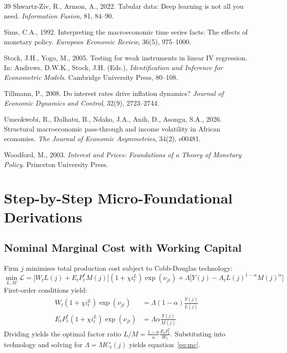 \documentclass[review,12pt]{elsarticle}
\begin{document}
\begin{thebibliography}{39}
Shwartz-Ziv, R., Armon, A., 2022. Tabular data: Deep learning is not all you need.
\textit{Information Fusion}, 81, 84--90.

Sims, C.A., 1992. Interpreting the macroeconomic time series facts: The effects
of monetary policy. \textit{European Economic Review}, 36(5), 975--1000.

Stock, J.H., Yogo, M., 2005. Testing for weak instruments in linear IV
regression. In: Andrews, D.W.K., Stock, J.H. (Eds.),
\textit{Identification and Inference for Econometric Models}.
Cambridge University Press, 80--108.

Tillmann, P., 2008. Do interest rates drive inflation dynamics?
\textit{Journal of Economic Dynamics and Control}, 32(9), 2723--2744.

Umeokwobi, R., Dalhatu, B., Ndako, J.A., Anih, D., Asongu, S.A., 2026.
Structural macroeconomic pass-through and income volatility in African economies.
\textit{The Journal of Economic Asymmetries}, 34(2), e00481.

Woodford, M., 2003. \textit{Interest and Prices: Foundations of a Theory of
Monetary Policy}. Princeton University Press.

\end{thebibliography}

\clearpage
\appendix

\section{Step-by-Step Micro-Foundational Derivations}
\label{app:derivations}

\subsection{Nominal Marginal Cost with Working Capital}
Firm $j$ minimises total production cost subject to Cobb-Douglas technology:
\[
\min_{L,M} \mathcal{L} = \bigl[W_t L(j) + E_t P_t^{*} M(j)\bigr](1+\chi i_t^L)\exp(\nu_{jt})
+ \Lambda\bigl[Y(j) - A_t L(j)^{1-\alpha} M(j)^{\alpha}\bigr]
\]
First-order conditions yield:
\begin{align*}
W_t(1+\chi i_t^L)\exp(\nu_{jt}) &= \Lambda(1-\alpha)\frac{Y(j)}{L(j)} \\
E_t P_t^{*}(1+\chi i_t^L)\exp(\nu_{jt}) &= \Lambda \alpha \frac{Y(j)}{M(j)}
\end{align*}
Dividing yields the optimal factor ratio $L/M = \frac{1-\alpha}{\alpha}\frac{E_t P_t^{*}}{W_t}$.
Substituting into technology and solving for $\Lambda = MC_t(j)$ yields equation~\eqref{eq:mc}.
\end{document}

